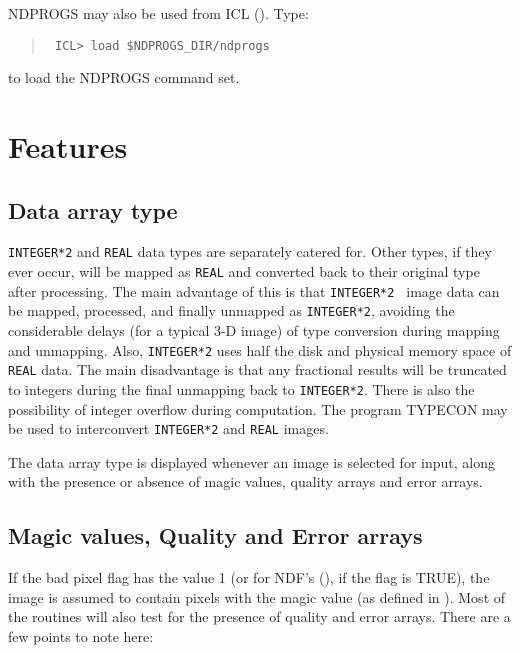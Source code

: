 NDPROGS may also be used from ICL (). Type:

\begin{quote}\tt
ICL\verb+>+ load \$NDPROGS\_DIR/ndprogs
\end{quote}

to load the NDPROGS command set.

\section{Features{}}
\label{sec:features}

\subsection{Data array type}

{\tt INTEGER*2} and {\tt REAL} data types are separately catered for.
Other types, if they ever occur, will be mapped as {\tt REAL} and
converted back to their original type after processing. The main
advantage of this is that {\tt INTEGER*2 } image data can be mapped,
processed, and finally unmapped as {\tt INTEGER*2}, avoiding the
considerable delays (for a typical 3-D image) of type conversion during
mapping and unmapping. Also, {\tt INTEGER*2} uses half the disk and
physical memory space of {\tt REAL} data. The main disadvantage is that
any fractional results will be truncated to integers during the final
unmapping back to {\tt INTEGER*2}. There is also the possibility of
integer overflow during computation. The program TYPECON may be used to
interconvert {\tt INTEGER*2} and {\tt REAL} images.

The data array type is displayed whenever an image is selected for
input, along with the presence or absence of magic values, quality
arrays and error arrays.

\subsection{Magic values, Quality and Error arrays}

If the bad pixel flag has the value 1 (or for NDF's (), if
the flag is TRUE), the image is assumed to contain
pixels with the magic value (as defined in ). Most of the
routines will also test for the presence of quality and error arrays.
There are a few points to note here:

